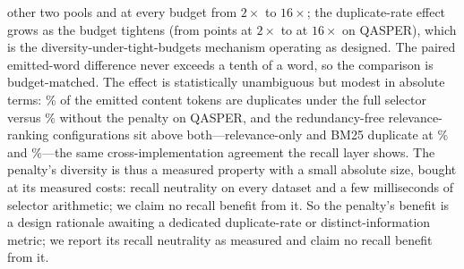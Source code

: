 \documentclass[preprint,12pt]{elsarticle}
\theoremstyle{remark}
\begin{document}
other two pools and at every budget from $2\times$ to $16\times$;
the duplicate-rate effect grows as the budget tightens (from
\RedPairQTwoDr{} points at $2\times$ to \RedPairQSixteenDr{} at
$16\times$ on QASPER), which is the diversity-under-tight-budgets
mechanism operating as designed. The paired emitted-word difference
never exceeds a tenth of a word, so the comparison is budget-matched.
The effect is statistically unambiguous but modest in absolute
terms: \RedQSieFourDr\% of the emitted content tokens are duplicates
under the full selector versus \RedQNoRedFourDr\% without the
penalty on QASPER, and the redundancy-free relevance-ranking
configurations sit above both---relevance-only and BM25 duplicate at
\RedQRelOnlyFourDr\% and \RedQBmFourDr\%---the same
cross-implementation agreement the recall layer shows. The penalty's
diversity is thus a measured property with a small absolute size,
bought at its measured costs: recall neutrality on every dataset and
a few milliseconds of selector arithmetic; we claim no recall
benefit from it.
\else
So the penalty's benefit is a design rationale awaiting a dedicated
duplicate-rate or distinct-information metric; we report its recall
neutrality as measured and claim no recall benefit from it.
\fi
\end{document}
